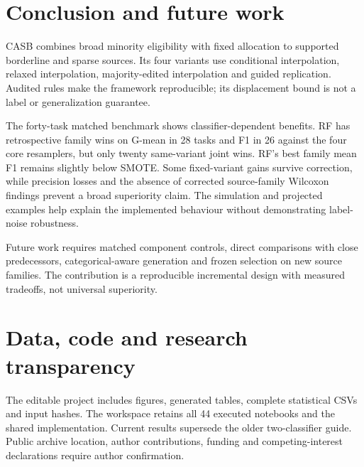 \documentclass[conference]{IEEEtran}
\begin{document}
\FloatBarrier
\section{Conclusion and future work}
CASB combines broad minority eligibility with fixed allocation to supported borderline and sparse sources. Its four variants use conditional interpolation, relaxed interpolation, majority-edited interpolation and guided replication. Audited rules make the framework reproducible; its displacement bound is not a label or generalization guarantee.

The forty-task matched benchmark shows classifier-dependent benefits. RF has retrospective family wins on G-mean in 28 tasks and F1 in 26 against the four core resamplers, but only twenty same-variant joint wins. RF's best family mean F1 remains slightly below SMOTE. Some fixed-variant gains survive correction, while precision losses and the absence of corrected source-family Wilcoxon findings prevent a broad superiority claim. The simulation and projected examples help explain the implemented behaviour without demonstrating label-noise robustness.

Future work requires matched component controls, direct comparisons with close predecessors, categorical-aware generation and frozen selection on new source families. The contribution is a reproducible incremental design with measured tradeoffs, not universal superiority.

\section*{Data, code and research transparency}
The editable project includes figures, generated tables, complete statistical CSVs and input hashes. The workspace retains all 44 executed notebooks and the shared implementation. Current results supersede the older two-classifier guide. Public archive location, author contributions, funding and competing-interest declarations require author confirmation.




\balance


\end{document}
